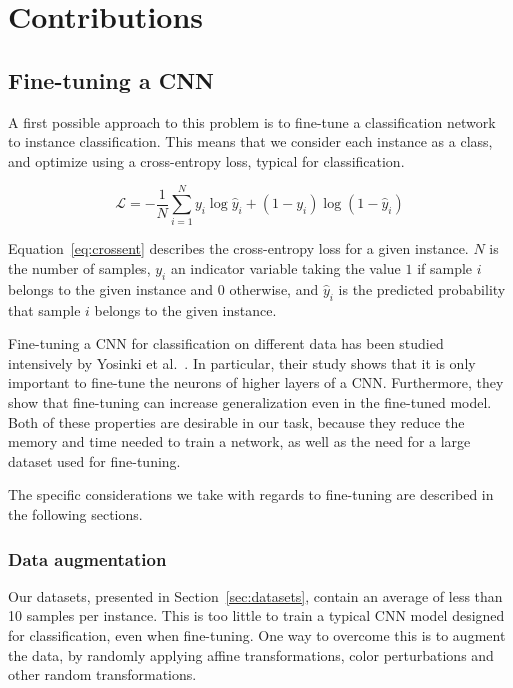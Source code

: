 

\chapter{Contributions}
\section{Fine-tuning a CNN}\label{sec:finetuning}
A first possible approach to this problem is to fine-tune
a classification network to instance classification. This means that
we consider each instance as a class, and optimize using a cross-entropy
loss, typical for classification.

\begin{equation}\label{eq:crossent}
\mathcal{L} = - \frac{1}{N}
\sum_{i=1}^N y_i \log \hat{y}_i + (1-y_i) \log (1-\hat{y}_i)
\end{equation}

Equation~\ref{eq:crossent} describes the cross-entropy loss for a
given instance. $N$ is the number of samples, $y_i$ an indicator
variable taking the value $1$ if sample $i$ belongs to the given
instance and $0$ otherwise, and $\hat{y}_i$ is the predicted probability
that sample $i$ belongs to the given instance.

Fine-tuning a CNN for classification on different data has been studied
intensively by Yosinki et al.~\cite{yosinski_how_2014}. In particular,
their study shows that it is only important to fine-tune the neurons
of higher layers of a CNN. Furthermore, they show that
fine-tuning can increase generalization even in the fine-tuned model.
Both of these properties are desirable in our task, because they reduce
the memory and time needed to train a network, as well as the need
for a large dataset used for fine-tuning.

The specific considerations we take with regards to fine-tuning are
described in the following sections.

\subsection{Data augmentation}
Our datasets, presented in Section~\ref{sec:datasets},
contain an average of less than 10 samples per instance. This is too little
to train a typical CNN model designed for classification, even when
fine-tuning.
One way to overcome this is to augment the data, by randomly applying
affine transformations, color perturbations and other random transformations.

